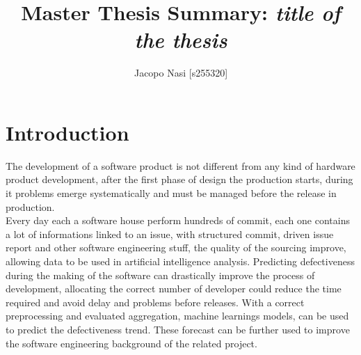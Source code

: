 \documentclass{article}
\begin{document}
\title{Master Thesis Summary: \textit{title of the thesis}}

\author{Jacopo Nasi [s255320]}

\maketitle

\section{Introduction}
The development of a software product is not different from any kind of hardware product development, after the first phase of design the production starts, during it problems emerge systematically and must be managed before the release in production.\\
Every day each a software house perform hundreds of commit, each one contains a lot of informations linked to an issue, with structured commit, driven issue report and other software engineering stuff, the quality of the sourcing improve, allowing data to be used in artificial intelligence analysis. Predicting defectiveness during the making of the software can drastically improve the process of development, allocating the correct number of developer could reduce the time required and avoid delay and problems before releases.
With a correct preprocessing and evaluated aggregation, machine learnings models, can be used to predict the defectiveness trend. These forecast can be further used to improve the software engineering background of the related project.
\end{document}
